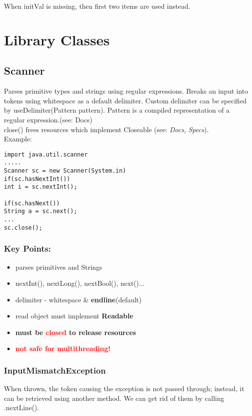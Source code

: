 \documentclass{report}
\begin{document}
When initVal is missing, then first two items are used instead.


\part{Library Classes}
\chapter{Scanner}
Parses primitive types and strings using regular expressions. Breaks an input into tokens using whitespace as a default delimiter. Custom delimiter can be specified by useDelimiter(Pattern pattern). Pattern is a compiled representation of a regular expression.(see: Docs)\\
close() frees resources which implement Closeable (see: \textit{Docs, Specs}).\\
Example:
\begin{verbatim}
import java.util.scanner
.....
Scanner sc = new Scanner(System.in)
if(sc.hasNextInt())
int i = sc.nextInt();

if(sc.hasNext())
String a = sc.next();
...
sc.close();
\end{verbatim}

\section{Key Points:}
\begin{itemize}
	\item parses primitives and Strings
	\item nextInt(), nextLong(), nextBool(), next()...
	\item delimiter - whitespace \& \textbf{endline}(default)
	\item read object must implement \textbf{Readable}
	\item \textbf{must be \textcolor{red}{closed} to release resources}
	\item \textcolor{red}{\textbf{not safe for multithreading!}}
\end{itemize}

\section{InputMismatchException}
When thrown, the token causing the exception is not passed through; instead, it can be retrieved using another method. We can get rid of them by calling .nextLine().
\end{document}
